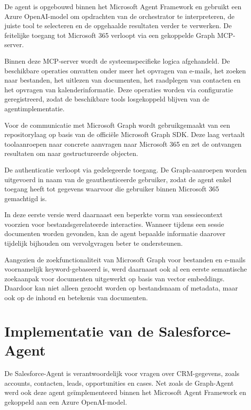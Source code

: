 De agent is opgebouwd binnen het Microsoft Agent Framework en gebruikt een Azure OpenAI-model om opdrachten van de orchestrator te interpreteren, de juiste tool te selecteren en de opgehaalde resultaten verder te verwerken. De feitelijke toegang tot Microsoft 365 verloopt via een gekoppelde Graph \gls{MCP}-server.

Binnen deze \gls{MCP}-server wordt de systeemspecifieke logica afgehandeld. De beschikbare operaties omvatten onder meer het opvragen van e-mails, het zoeken naar bestanden, het uitlezen van documenten, het raadplegen van contacten en het opvragen van kalenderinformatie. Deze operaties worden via configuratie geregistreerd, zodat de beschikbare tools losgekoppeld blijven van de agentimplementatie.

Voor de communicatie met Microsoft Graph wordt gebruikgemaakt van een repositorylaag op basis van de officiële Microsoft Graph \gls{SDK}. Deze laag vertaalt toolaanroepen naar concrete aanvragen naar Microsoft 365 en zet de ontvangen resultaten om naar gestructureerde objecten.

De authenticatie verloopt via gedelegeerde toegang. De Graph-aanroepen worden uitgevoerd in naam van de geauthenticeerde gebruiker, zodat de agent enkel toegang heeft tot gegevens waarvoor die gebruiker binnen Microsoft 365 gemachtigd is.

In deze eerste versie werd daarnaast een beperkte vorm van sessiecontext voorzien voor bestandsgerelateerde interacties. Wanneer tijdens een sessie documenten worden gevonden, kan de agent bepaalde informatie daarover tijdelijk bijhouden om vervolgvragen beter te ondersteunen.


Aangezien de zoekfunctionaliteit van Microsoft Graph voor bestanden en e-mails voornamelijk keyword-gebaseerd is, werd daarnaast ook al een eerste semantische zoekaanpak voor documenten uitgewerkt op basis van vector embeddings. Daardoor kan niet alleen gezocht worden op bestandsnaam of metadata, maar ook op de inhoud en betekenis van documenten.

\section{Implementatie van de Salesforce-Agent}
\label{sec:impl-salesforce}


De Salesforce-Agent is verantwoordelijk voor vragen over \gls{CRM}-gegevens, zoals accounts, contacten, leads, opportunities en cases. Net zoals de Graph-Agent werd ook deze agent geïmplementeerd binnen het Microsoft Agent Framework en gekoppeld aan een Azure OpenAI-model.

